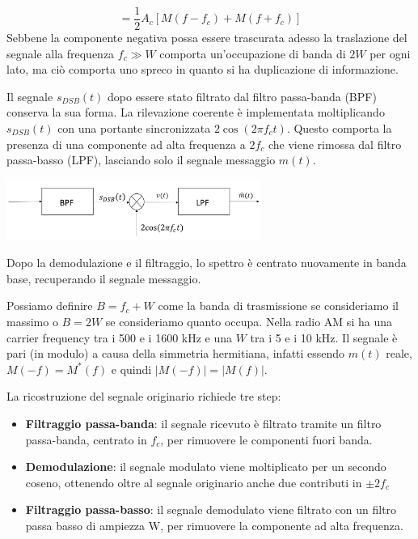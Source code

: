 \[
    = \frac{1}{2} A_c [M(f - f_c) + M(f + f_c)]
\]
Sebbene la componente negativa possa essere trascurata adesso la traslazione del segnale alla frequenza $f_c \gg W$ comporta un'occupazione di banda di $2W$ per ogni lato, ma ciò comporta uno spreco in quanto si ha duplicazione di informazione.

\begin{center}
    
\end{center}


Il segnale \( s_{DSB}(t) \) dopo essere stato filtrato dal filtro passa-banda (BPF) conserva la sua forma.
La rilevazione coerente è implementata moltiplicando \( s_{DSB}(t) \) con una portante sincronizzata \( 2\cos(2\pi f_c t) \).
Questo comporta la presenza di una componente ad alta frequenza a \( 2f_c \) che viene rimossa dal filtro passa-basso (LPF), lasciando solo il segnale messaggio \( m(t) \).
\begin{center}
    \includegraphics[width=0.625\textwidth]{imgs/analog_pam_receiver.png}
\end{center}

Dopo la demodulazione e il filtraggio, lo spettro è centrato nuovamente in banda base, recuperando il segnale messaggio.

Possiamo definire $B = f_c + W$ come la banda di trasmissione se consideriamo il massimo o $B = 2W$ se consideriamo quanto occupa.
Nella radio AM si ha una carrier frequency tra i 500 e i 1600 kHz e una $W$ tra i 5 e i 10 kHz.
Il segnale è pari (in modulo) a causa della simmetria hermitiana, infatti essendo $m(t)$ reale, $M(-f) = M^*(f)$ e quindi $|M(-f)| = |M(f)|$.


La ricostruzione del segnale originario richiede tre step:
\begin{itemize}
    \item \textbf{Filtraggio passa-banda}: il segnale ricevuto è filtrato tramite un filtro passa-banda, centrato in \( f_c \), per rimuovere le componenti fuori banda.
    \item \textbf{Demodulazione}: il segnale modulato viene moltiplicato per un secondo coseno, ottenendo oltre al segnale originario anche due contributi in \(\pm 2f_c \)
    \item \textbf{Filtraggio passa-basso}: il segnale demodulato viene filtrato con un filtro passa basso di ampiezza W, per rimuovere la componente ad alta frequenza.
\end{itemize}

